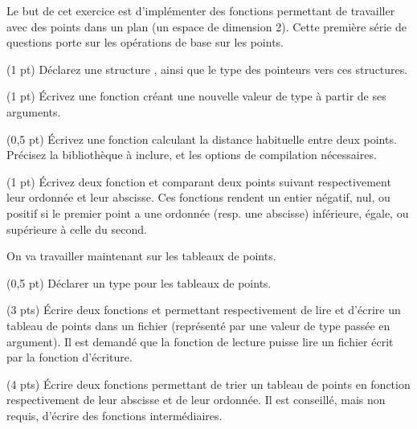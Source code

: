 
Le but de cet exercice est d'impl{\'e}menter des fonctions permettant de
travailler avec des points dans un plan (un espace de dimension 2).
Cette premi{\`e}re s{\'e}rie de questions porte sur les op{\'e}rations de base sur
les points.

\question (1 pt) D{\'e}clarez une structure , ainsi que le
type  des pointeurs vers ces structures.


\question (1 pt) {\'E}crivez une fonction  cr{\'e}ant une nouvelle
valeur de type  {\`a} partir de ses arguments.

\question (0,5 pt) {\'E}crivez une fonction  calculant la
distance habituelle entre deux points. Pr{\'e}cisez la biblioth{\`e}que {\`a}
inclure, et les options de compilation n{\'e}cessaires.


\question (1 pt) {\'E}crivez deux fonction  et
 comparant deux points suivant respectivement leur
ordonn{\'e}e et leur abscisse. Ces fonctions rendent un entier n{\'e}gatif,
nul, ou positif si le premier point a une ordonn{\'e}e (resp. une
abscisse) inf{\'e}rieure, {\'e}gale, ou sup{\'e}rieure {\`a} celle du second.


On va travailler maintenant sur les tableaux de points.

\question (0,5 pt) D{\'e}clarer un type  pour les tableaux de points.


\question (3 pts) {\'E}crire deux fonctions  et
 permettant respectivement de lire et d'{\'e}crire un
tableau de points dans un fichier (repr{\'e}sent{\'e} par une valeur de type
 pass{\'e}e en argument). Il est demand{\'e} que la fonction de
lecture puisse lire un fichier {\'e}crit par la fonction d'{\'e}criture.

\question (4 pts) {\'E}crire deux fonctions permettant de trier un tableau
de points en fonction respectivement de leur abscisse et de leur
ordonn{\'e}e. Il est conseill{\'e}, mais non requis, d'{\'e}crire des fonctions
interm{\'e}diaires.
